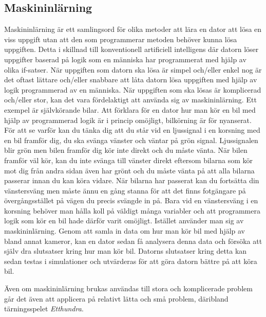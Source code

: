 \documentclass[12pt,a4paper]{article}
\begin{document}
    \subsection{Maskininlärning}\label{subsec:maskininlarning}
      Maskininlärning är ett samlingsord för olika metoder att lära en dator att lösa en viss uppgift utan att den som programmerar metoden behöver kunna lösa uppgiften. Detta i skillnad till konventionell artificiell intelligens där datorn löser uppgifter baserad på logik som en människa har programmerat med hjälp av olika if-satser. När uppgiften som datorn ska lösa är simpel och/eller enkel nog är det oftast lättare och/eller snabbare att låta datorn lösa uppgiften med hjälp av logik programmerad av en människa. När uppgiften som ska lösas är komplicerad och/eller stor, kan det vara fördelaktigt att använda sig av maskininlärning. Ett exempel är självkörande bilar. Att förklara för en dator hur man kör en bil med hjälp av programmerad logik är i princip omöjligt, bilkörning är för nyanserat. För att se varför kan du tänka dig att du står vid en ljussignal i en korsning med en bil framför dig, du ska svänga vänster och väntar på grön signal. Ljussignalen blir grön men bilen framför dig kör inte direkt och du måste vänta. När bilen framför väl kör, kan du inte svänga till vänster direkt eftersom bilarna som kör mot dig från andra sidan även har grönt och du måste vänta på att alla bilarna passerar innan du kan köra vidare. När bilarna har passerat kan du fortsätta din vänstersväng men måste ännu en gång stanna för att det finns fotgängare på övergångsstället på vägen du precis svängde in på. Bara vid en vänstersväng i en korsning behöver man hålla koll på väldigt många variabler och att programmera logik som kör en bil hade därför varit omöjligt. Istället använder man sig av maskininlärning. Genom att samla in data om hur man kör bil med hjälp av bland annat kameror, kan en dator sedan få analysera denna data och försöka att själv dra slutsatser kring hur man kör bil. Datorns slutsatser kring detta kan sedan testas i simulationer och utvärderas för att göra datorn bättre på att köra bil. 
      
      Även om maskininlärning brukas användas till stora och komplicerade problem går det även att applicera på relativt lätta och små problem, däribland tärningsspelet \emph{Etthundra}. 


      \cleardoublepage
      

\end{document}
